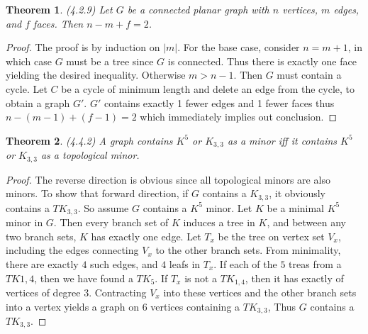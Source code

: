\documentclass[12pt]{article}
\newtheorem{theorem}{Theorem}
\begin{document}
\begin{theorem} (4.2.9) Let $G$ be a connected planar graph with $n$
  vertices, $m$ edges, and $f$ faces. Then $n - m + f = 2$.
\end{theorem}
\begin{proof} The proof is by induction on $|m|$. For the base case,
  consider $n = m + 1$, in which case $G$ must be a tree since $G$ is
  connected. Thus there is exactly one face yielding the desired
  inequality. Otherwise $m > n - 1$. Then $G$ must contain a
  cycle. Let $C$ be a cycle of minimum length and delete an edge from
  the cycle, to obtain a graph $G'$. $G'$ contains exactly 1 fewer
  edges and 1 fewer faces thus $n - (m - 1) + (f - 1) = 2$ which
  immediately implies out conclusion.
\end{proof}

\begin{theorem} (4.4.2) A graph contains $K^5$ or $K_{3,3}$ as a minor
  iff it contains $K^5$ or $K_{3,3}$ as a topological minor.
\end{theorem}
\begin{proof} The reverse direction is obvious since all topological
  minors are also minors. To show that forward direction, if $G$
  contains a $K_{3,3}$, it obviously contains a $TK_{3,3}$. So assume
  $G$ contains a $K^5$ minor. Let $K$ be a minimal $K^5$ minor in
  $G$. Then every branch set of $K$ induces a tree in $K$, and between
  any two branch sets, $K$ has exactly one edge. Let $T_x$ be the tree
  on vertex set $V_x$, including the edges connecting $V_x$ to the
  other branch sets. From minimality, there are exactly $4$ such
  edges, and $4$ leafs in $T_x$. If each of the $5$ treas from a
  $TK{1,4}$, then we have found a $TK_5$. If $T_x$ is not a
  $TK_{1,4}$, then it has exactly of vertices of degree
  $3$. Contracting $V_x$ into these vertices and the other branch sets
  into a vertex yields a graph on $6$ vertices containing a
  $TK_{3,3}$, Thus $G$ contains a $TK_{3,3}$.
\end{proof}
\end{document}
